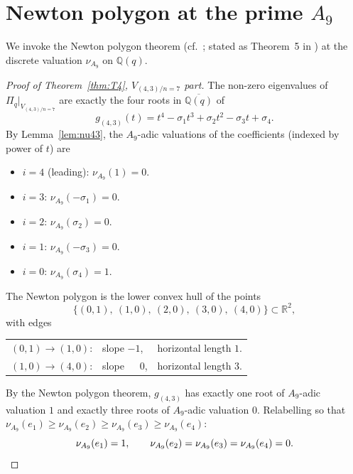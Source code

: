 \documentclass[11pt]{article}
\theoremstyle{plain}
\theoremstyle{definition}
\theoremstyle{remark}
\newcommand{\Q}{\mathbb{Q}}
\newcommand{\Pibs}{\Pi_q}
\newcommand{\valA}{\nu_{A_9}}
\begin{document}
\section{Newton polygon at the prime $A_9$}

We invoke the Newton polygon theorem (cf.\ \cite[Ch.~II,~Cor.~6.5]{Neukirch};
stated as Theorem~5 in \cite{Newton28}) at the discrete valuation $\valA$ on
$\Q(q)$.

\begin{proof}[Proof of Theorem~\ref{thm:T4}, $V_{(4,3)/n=7}$ part]
The non-zero eigenvalues of $\Pibs|_{V_{(4,3)/n=7}}$ are exactly the four roots in
$\overline{\Q(q)}$ of
\[ g_{(4,3)}(t) = t^4 - \sigma_1 t^3 + \sigma_2 t^2 - \sigma_3 t + \sigma_4. \]
By Lemma~\ref{lem:nu43}, the $A_9$-adic valuations of the coefficients (indexed
by power of $t$) are
\begin{itemize}
\item $i = 4$ (leading): $\valA(1) = 0$.
\item $i = 3$: $\valA(-\sigma_1) = 0$.
\item $i = 2$: $\valA(\sigma_2) = 0$.
\item $i = 1$: $\valA(-\sigma_3) = 0$.
\item $i = 0$: $\valA(\sigma_4) = 1$.
\end{itemize}
The Newton polygon is the lower convex hull of the points
\[ \big\{(0, 1),\ (1, 0),\ (2, 0),\ (3, 0),\ (4, 0)\big\} \subset \mathbb{R}^2, \]
with edges
\begin{center}
\begin{tabular}{lll}
$(0,1) \to (1,0)$: & slope $-1$, & horizontal length $1$. \\
$(1,0) \to (4,0)$: & slope $\phantom{-}0$, & horizontal length $3$.
\end{tabular}
\end{center}
By the Newton polygon theorem, $g_{(4,3)}$ has exactly one root of $A_9$-adic
valuation $1$ and exactly three roots of $A_9$-adic valuation $0$.  Relabelling
so that $\valA(e_1) \geq \valA(e_2) \geq \valA(e_3) \geq \valA(e_4)$:
\[ \valA(e_1) = 1, \qquad \valA(e_2) = \valA(e_3) = \valA(e_4) = 0. \qedhere \]
\end{proof}
\end{document}
